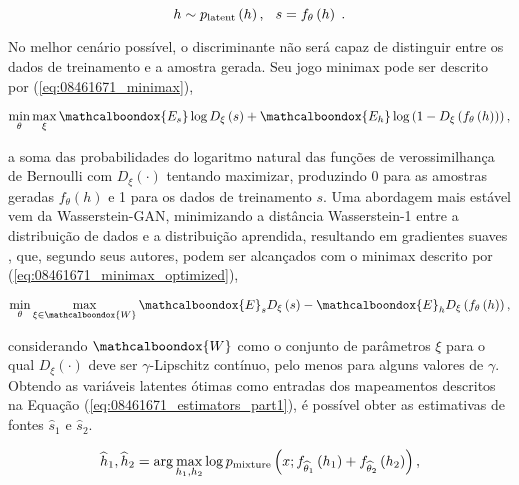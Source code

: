 \begin{equation}
    h\sim p_{\text{latent}}\left(h\right), \hspace{0.25cm} s = f_{\theta}\left(h\right) \hspace{0.10cm}.
    \label{eq:08461671_gen_process}
    \vspace{0.2cm}
\end{equation}

No melhor cenário possível, o discriminante não será capaz de distinguir entre os dados de treinamento e a amostra gerada. Seu jogo minimax pode ser descrito por (\ref{eq:08461671_minimax}),

\begin{equation}
    \min_{\theta}\max_{\xi}\mathcalboondox{E_{s}}\log D_{\xi}\left(s\right) + \mathcalboondox{E_{h}}\log \left(1-D_{\xi}\left(f_{\theta}\left(h\right)\right)\right),
    \label{eq:08461671_minimax}
    \vspace{0.2cm}
\end{equation}

\noindent a soma das probabilidades do logaritmo natural das funções de verossimilhança de Bernoulli com $D_ {\xi}\left(\cdot\right)$ tentando maximizar, produzindo 0 para as amostras geradas $f_{\theta}\left(h\right)$ e 1 para os dados de treinamento $s$. Uma abordagem mais estável vem da Wasserstein-GAN, minimizando a distância Wasserstein-1 \citep{OLKIN1982257} entre a distribuição de dados e a distribuição aprendida, resultando em gradientes suaves \citep{arjovsky2017wasserstein}, que, segundo seus autores, podem ser alcançados com o minimax descrito por (\ref{eq:08461671_minimax_optimized}),

\begin{equation}
    \min_{\theta}\max_{\xi\in\mathcalboondox{W}}\mathcalboondox{E}_{s}D_{\xi}\left(s\right) - \mathcalboondox{E}_{h}D_{\xi}\left(f_{\theta}\left(h\right)\right),
    \label{eq:08461671_minimax_optimized}
    \vspace{0.2cm}
\end{equation}


\noindent considerando $\mathcalboondox{W}$ como o conjunto de parâmetros $\xi$ para o qual $D_{\xi}\left(\cdot\right)$ deve ser $\gamma$-Lipschitz contínuo, pelo menos para alguns valores de $\gamma$. Obtendo as variáveis latentes ótimas como entradas dos mapeamentos
 descritos na Equação (\ref{eq:08461671_estimators_part1}), é possível obter as estimativas de fontes $\widehat{s}_{1}$ e $\widehat{s}_{2}$.

\begin{equation}
    \widehat{h}_{1}, \widehat{h}_{2} = \arg \max_{h_{1}, h_{2}} \log p_{\text{mixture}}\left(x; f_{\widehat{\theta}_{1}}\left(h_{1}\right)+f_{\widehat{\theta}_{2}}\left(h_{2}\right)\right),
    \label{eq:08461671_estimators_part1}
    \vspace{0.2cm}
\end{equation}


